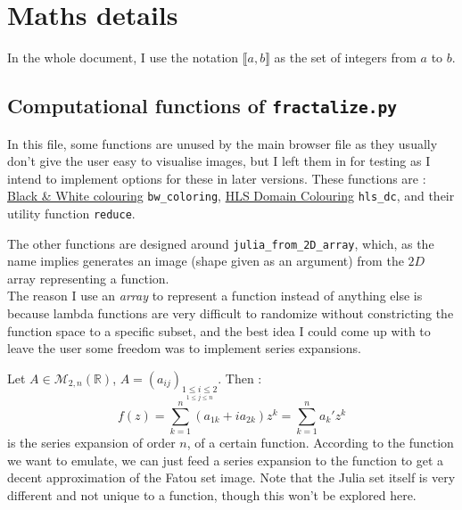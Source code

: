 \documentclass{article}
\newcommand\R{\mathbb{R}}
\begin{document}
\section{Maths details}

In the whole document, I use the notation $\llbracket a,b \rrbracket$ as the set of integers from $a$ to $b$. \\

\subsection{Computational functions of \texttt{fractalize.py}}

In this file, some functions are unused by the main browser file as they usually don't give the user easy to visualise images, but I left them in for testing as I intend to implement options for these in later versions. These functions are : \\
\underline{Black \& White colouring} \texttt{bw\_coloring}, \underline{HLS Domain Colouring} \texttt{hls\_dc}, and their utility function \texttt{reduce}. \\
\vspace{5mm}

The other functions are designed around \texttt{julia\_from\_2D\_array}, which, as the name implies generates an image (shape given as an argument) from the $2D$ array representing a function. \\
The reason I use an \textit{array} to represent a function instead of anything else is because lambda functions are very difficult to randomize without constricting the function space to a specific subset, and the best idea I could come up with to leave the user some freedom was to implement series expansions. \\
\vspace{5mm}

Let $A \in \mathcal{M}_{2,n}(\R)$, $A = (a_{ij})_{\underset{1 \leq j \leq n}{1 \leq i \leq 2}}$. Then : \\
$$f(z) = \sum_{k=1}^n{(a_{1k}+i a_{2k})z^k} = \sum_{k=1}^n{a_k'z^k}$$
is the series expansion of order $n$, of a certain function. According to the function we want to emulate, we can just feed a series expansion to the function to get a decent approximation of the Fatou set image. Note that the Julia set itself is very different and not unique to a function, though this won't be explored here. \\
\vspace{5mm}
\end{document}
